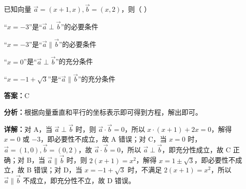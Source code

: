 \begin{question}[points=5]
已知向量 $\vec{a}=(x+1,x),\vec{b}=(x,2)$，则（   ）
\begin{choices}
  \item “$x=-3$”是“$\vec{a}\perp\vec{b}$”的必要条件
  \item “$x=-3$”是“$\vec{a}\parallel\vec{b}$”的必要条件
  \item “$x=0$”是“$\vec{a}\perp\vec{b}$”的充分条件
  \item “$x=-1+\sqrt{3}$”是“$\vec{a}\parallel\vec{b}$”的充分条件
\end{choices}
\begin{solution}
\textbf{答案：}C

\textbf{分析：}根据向量垂直和平行的坐标表示即可得到方程，解出即可。

\textbf{详解：}对 A，当 $\vec{a}\perp\vec{b}$ 时，则 $\vec{a}\cdot\vec{b}=0$，所以 $x\cdot(x+1)+2x=0$，解得 $x=0$ 或 $-3$，即必要性不成立，故 A 错误；对 C，当 $x=0$ 时，$\vec{a}=(1,0),\vec{b}=(0,2)$，故 $\vec{a}\cdot\vec{b}=0$，所以 $\vec{a}\perp\vec{b}$，即充分性成立，故 C 正确；对 B，当 $\vec{a}\parallel\vec{b}$ 时，则 $2(x+1)=x^2$，解得 $x=1\pm\sqrt{3}$，即必要性不成立，故 B 错误；对 D，当 $x=-1+\sqrt{3}$ 时，不满足 $2(x+1)=x^2$，所以 $\vec{a}\parallel\vec{b}$ 不成立，即充分性不立，故 D 错误。
\end{solution}
\end{question}

